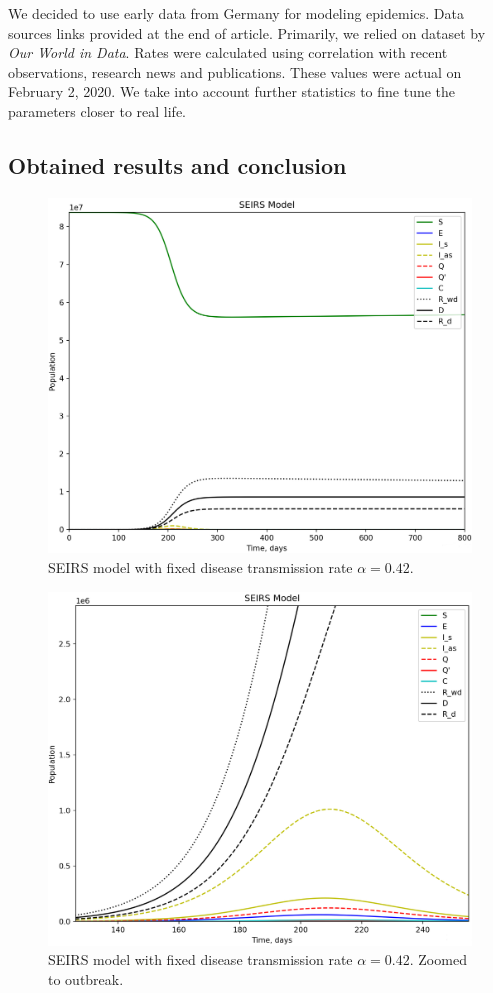 \documentclass[12pt, a4paper]{article}
\begin{document}
	We decided to use early data from Germany for modeling epidemics. Data sources links provided at the end of article. Primarily, we relied on dataset by \textit{Our World in Data}. Rates were calculated using correlation with recent observations, research news and publications. These values were actual on February 2, 2020. We take into account further statistics to fine tune the parameters closer to real life.

	\newpage

	\subsection{Obtained results and conclusion}

	\begin{figure}[h!]
		\centering
		\includegraphics[width=12cm]{seirs.png}
		\caption{SEIRS model with fixed disease transmission rate $\alpha = 0.42$.}
	\end{figure}

	\begin{figure}[h!]
		\centering
		\includegraphics[width=12cm]{seirs_2.png}
		\caption{SEIRS model with fixed disease transmission rate $\alpha = 0.42$. Zoomed to outbreak.}
	\end{figure}
\end{document}
